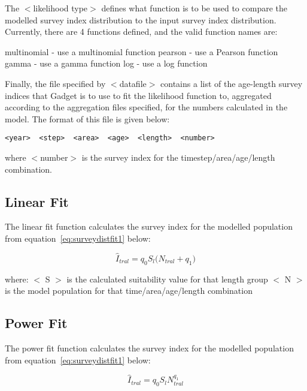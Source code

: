 \documentclass[10pt,twoside]{book}
\begin{document}
\bigskip
The $<$likelihood type$>$ defines what function is to be used to compare the modelled survey index distribution to the input survey index distribution.  Currently, there are 4 functions defined, and the valid function names are:

\bigskip
multinomial - use a multinomial function\newline
pearson - use a Pearson function\newline
gamma - use a gamma function\newline
log - use a log function

\bigskip
Finally, the file specified by $<$datafile$>$ contains a list of the age-length survey indices that Gadget is to use to fit the likelihood function to, aggregated according to the aggregation files specified, for the numbers calculated in the model.  The format of this file is given below:

{\small\begin{verbatim}
<year>  <step>  <area>  <age>  <length>  <number>
\end{verbatim}}

where $<$number$>$ is the survey index for the timestep/area/age/length combination.

\subsection{Linear Fit}
The linear fit function calculates the survey index for the modelled population from equation~\ref{eq:surveydistfit1} below:

\begin{equation}\label{eq:surveydistfit1}
\widehat{I}_{tral} = q_{0} S_{l} \big( N_{tral} + q_{1} \big)
\end{equation}

where:\newline
$<$ S $>$ is the calculated suitability value for that length group\newline
$<$ N $>$ is the model population for that time/area/age/length combination

\subsection{Power Fit}
The power fit function calculates the survey index for the modelled population from equation~\ref{eq:surveydistfit1} below:

\begin{equation}\label{eq:surveydistfit2}
\widehat{I}_{tral} = q_{0} S_{l} N_{tral} ^{q_{1}}
\end{equation}
\end{document}
